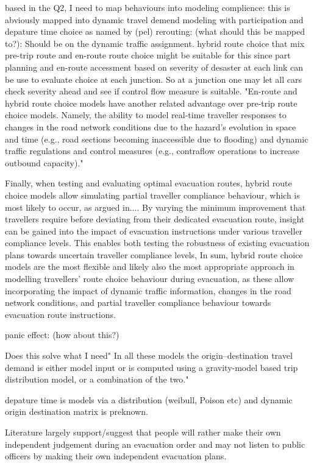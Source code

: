 based in the Q2, I need to map behaviours into modeling 
complience: this is abviously mapped into dynamic travel demend modeling with participation and depature time choice as named by (pel)
rerouting: (what should this be mapped to?): Should be on the dynamic traffic assignment. hybrid route choice that 
mix pre-trip route and en-route route choice might be suitable for this since part planning and en-route accessment based on severity of desaster at each link
can be use to evaluate choice at each junction. So at a junction one may let all cars check severity ahead and see if control flow measure is suitable. 
"En-route and hybrid route choice models have another related advantage over pre-trip
route choice models. Namely, the ability to model real-time traveller responses to changes
in the road network conditions due to the hazard’s evolution in space and time (e.g., road
sections becoming inaccessible due to flooding) and dynamic traffic regulations and control
measures (e.g., contraflow operations to increase outbound capacity)."

Finally, when testing and evaluating optimal evacuation routes, hybrid route choice
models allow simulating partial traveller compliance behaviour, which is most likely to
occur, as argued in.... By varying
the minimum improvement that travellers require before deviating from their dedicated
evacuation route, insight can be gained into the impact of evacuation instructions under
various traveller compliance levels. This enables both testing the robustness of existing
evacuation plans towards uncertain traveller compliance levels,
In sum, hybrid route choice models are the most flexible and likely also the most
appropriate approach in modelling travellers’ route choice behaviour during evacuation, as
these allow incorporating the impact of dynamic traffic information, changes in the road
network conditions, and partial traveller compliance behaviour towards evacuation route
instructions.



panic effect: (how about this?)


Does this solve what I need" In all these models the origin–destination travel demand is either model input or is
computed using a gravity-model based trip distribution model, or a combination of the two."

depature time is models via a distribution (weibull, Poison etc) and dynamic origin destination matrix is preknown. 

Literature largely support/suggest that people will rather make their own independent judgement during 
an evacuation order and may not listen to public officers by making their own independent evacuation plans. 





